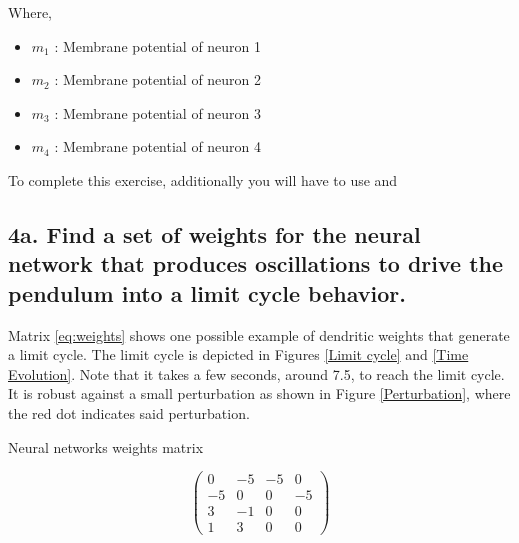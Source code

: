\documentclass{cmc}
\begin{document}
Where,

\begin{itemize}
\item $m_1$ : Membrane potential of neuron 1
\item $m_2$ : Membrane potential of neuron 2
\item $m_3$ : Membrane potential of neuron 3
\item $m_4$ : Membrane potential of neuron 4
\end{itemize}

To complete this exercise, additionally you will have to use
 and 

\subsection*{4a. Find a set of weights for the neural network that
  produces oscillations to drive the pendulum into a limit cycle
  behavior.}
\label{sec:4a}
Matrix \eqref{eq:weights} shows one possible example of dendritic weights that generate a limit cycle. The limit cycle is depicted in Figures \ref{Limit cycle} and \ref{Time Evolution}. Note that it takes a few seconds, around 7.5, to reach the limit cycle. It is robust against a small perturbation as shown in Figure \ref{Perturbation}, where the red dot indicates said perturbation.

\begin{mycapequ}[!ht]
\caption{Neural networks weights matrix}
\begin{equation}
\begin{pmatrix}
0 & -5 & -5 & 0 \\
-5 & 0 & 0 & -5 \\
3 & -1 & 0 & 0 \\
1 & 3 & 0 & 0 
\end{pmatrix}
\label{eq:weights}
\end{equation}
\end{mycapequ}

\end{document}
